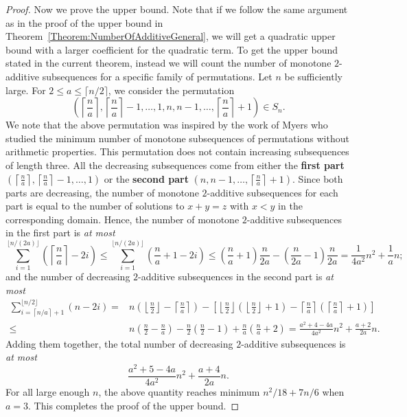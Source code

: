 \documentclass[10pt,a4paper]{amsart}
\begin{document}
\begin{proof}
Now we prove the upper bound. Note that if we follow the same argument as in the proof of the upper bound in Theorem~\ref{Theorem:NumberOfAdditiveGeneral}, we will get a quadratic upper bound with a larger coefficient for the quadratic term. To get the upper bound stated in the current theorem, instead we will count the number of monotone $2$-additive subsequences for a specific family of permutations. Let $n$ be sufficiently large. For $2\leq a\leq\lceil n/2\rceil$, we consider the permutation
    \[
    \left(\left\lceil\frac{n}{a}\right\rceil,\left\lceil\frac{n}{a}\right\rceil-1,\ldots,1,n,n-1,\ldots, \left\lceil\frac{n}{a}\right\rceil+1\right)\in S_n.
    \]
    We note that the above permutation was inspired by the work of Myers \cite{Myers2002} who studied the minimum number of monotone subsequences of permutations without arithmetic properties. This permutation does not contain increasing subsequences of length three. All the decreasing subsequences come from either the \textbf{first part} $\left(\left\lceil\frac{n}{a}\right\rceil,\left\lceil\frac{n}{a}\right\rceil-1,\ldots,1\right)$ or the \textbf{second part} $\left(n,n-1,\ldots, \left\lceil\frac{n}{a}\right\rceil+1\right)$. Since both parts are decreasing, the number of monotone $2$-additive subsequences for each part is equal to the number of solutions to $x+y=z$ with $x<y$ in the corresponding domain. Hence, the number of monotone $2$-additive subsequences in the first part is \textit{at most}
    \[
    \sum_{i=1}^{\lfloor n/(2a)\rfloor}\left(\left\lceil\frac{n}{a}\right\rceil-2i\right)\leq\sum_{i=1}^{\lfloor n/(2a)\rfloor}\left(\frac{n}{a}+1-2i\right)\leq\left(\frac{n}{a}+1\right)\frac{n}{2a}-\left(\frac{n}{2a}-1\right)\frac{n}{2a}=\frac{1}{4a^2}n^2+\frac{1}{a}n;
    \]
    and the number of decreasing $2$-additive subsequences in the second part is \textit{at most}
    \[
    \begin{split}
    \sum_{i=\left\lceil n/a\right\rceil+1}^{\lfloor n/2\rfloor}(n-2i)=&n\left(\left\lfloor\frac{n}{2}\right\rfloor-\left\lceil\frac{n}{a}\right\rceil\right)-\left[\left\lfloor\frac{n}{2}\right\rfloor\left(\left\lfloor\frac{n}{2}\right\rfloor+1\right)-\left\lceil\frac{n}{a}\right\rceil\left(\left\lceil\frac{n}{a}\right\rceil+1\right)\right]\\\leq&n\left(\frac{n}{2}-\frac{n}{a}\right)-\frac{n}{2}\left(\frac{n}{2}-1\right)+\frac{n}{a}\left(\frac{n}{a}+2\right)=\frac{a^2+4-4a}{4a^2}n^2+\frac{a+2}{2a}n.
    \end{split}
    \]
    Adding them together, the total number of decreasing $2$-additive subsequences is \textit{at most}
    \[
    \frac{a^2+5-4a}{4a^2}n^2+\frac{a+4}{2a}n.
    \]
    For all large enough $n$, the above quantity reaches minimum $n^2/18+7n/6$ when $a=3$. This completes the proof of the upper bound.
\end{proof}
\end{document}

